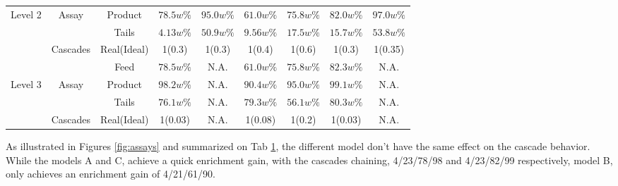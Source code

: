 \begin{table}[h!]
\begin{tabular}{ccccccccc}
Level 2 & Assay      & Product    & $78.5w\%$ & $95.0w\%$ & $61.0w\%$ & $75.8w\%$ & $82.0w\%$ & $97.0w\%$ \\
        &            & Tails      & $4.13w\%$ & $50.9w\%$ & $9.56w\%$ & $17.5w\%$ & $15.7w\%$ & $53.8w\%$ \\
        & Cascades   & Real(Ideal)& 1(0.3)    & 1(0.3)    & 1(0.4)    & 1(0.6)    & 1(0.3)    & 1(0.35)   \\
\midrule                                                                                                 
        &            & Feed       & $78.5w\%$ & N.A.      & $61.0w\%$ & $75.8w\%$ & $82.3w\%$ & N.A.      \\
Level 3 & Assay      & Product    & $98.2w\%$ & N.A.      & $90.4w\%$ & $95.0w\%$ & $99.1w\%$ & N.A.      \\
        &            & Tails      & $76.1w\%$ & N.A.      & $79.3w\%$ & $56.1w\%$ & $80.3w\%$ & N.A.      \\
        & Cascades   & Real(Ideal)& 1(0.03)   & N.A.      & 1(0.08)   & 1(0.2)    & 1(0.03)   & N.A.      \\
\bottomrule
\end{tabular}
  \label{tab:level}
\end{table}

As illustrated in Figures \ref{fig:assays} and summarized on Tab
\ref{tab:level}, the different model don't have the same effect on the cascade
behavior. While the models A and C, achieve a quick enrichment gain, with the
cascades chaining, 4/23/78/98 and 4/23/82/99 respectively, model B, only
achieves an enrichment gain of 4/21/61/90. 


